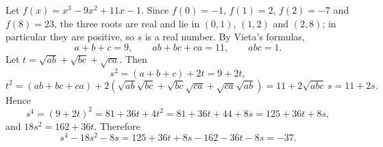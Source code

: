 Let $f(x)=x^3-9x^2+11x-1$. Since $f(0)=-1$, $f(1)=2$, $f(2)=-7$ and $f(8)=23$, the three roots are real and lie in $(0,1)$, $(1,2)$ and $(2,8)$; in particular they are positive, so $s$ is a real number. By Vieta's formulas,
\[
a+b+c=9,\qquad ab+bc+ca=11,\qquad abc=1 .
\]
Let $t=\sqrt{ab}+\sqrt{bc}+\sqrt{ca}$. Then
\[
s^2=(a+b+c)+2t=9+2t,
\]
\[
t^2=(ab+bc+ca)+2\left(\sqrt{ab}\sqrt{bc}+\sqrt{bc}\sqrt{ca}+\sqrt{ca}\sqrt{ab}\right)=11+2\sqrt{abc}\,s=11+2s .
\]
Hence
\[
s^4=(9+2t)^2=81+36t+4t^2=81+36t+44+8s=125+36t+8s,
\]
and $18s^2=162+36t$. Therefore
\[
s^4-18s^2-8s=125+36t+8s-162-36t-8s=\boxed{-37}.
\]
